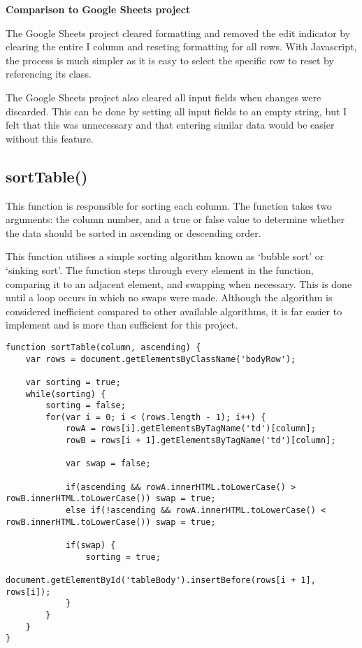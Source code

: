 \documentclass[letterpaper]{article}
\begin{document}
\textbf{Comparison to Google Sheets project}

The Google Sheets project cleared formatting and removed the edit indicator by clearing the entire I column and reseting formatting for all rows.
With Javascript, the process is much simpler as it is easy to select the specific row to reset by referencing its class.

The Google Sheets project also cleared all input fields when changes were discarded.
This can be done by setting all input fields to an empty string, but I felt that this was unnecessary and that entering similar data would be easier without this feature.

\subsection{sortTable()}

This function is responsible for sorting each column.
The function takes two arguments: the column number, and a true or false value to determine whether the data should be sorted in ascending or descending order.

This function utilises a simple sorting algorithm known as `bubble sort' or `sinking sort'.
The function steps through every element in the function, comparing it to an adjacent element, and swapping when necessary.
This is done until a loop occurs in which no swaps were made.
Although the algorithm is considered inefficient compared to other available algorithms, it is far easier to implement and is more than sufficient for this project.

\begin{lstlisting}[firstnumber=222]
function sortTable(column, ascending) {
    var rows = document.getElementsByClassName('bodyRow');

    var sorting = true;
    while(sorting) {
        sorting = false;
        for(var i = 0; i < (rows.length - 1); i++) {
            rowA = rows[i].getElementsByTagName('td')[column];
            rowB = rows[i + 1].getElementsByTagName('td')[column];

            var swap = false;

            if(ascending && rowA.innerHTML.toLowerCase() > rowB.innerHTML.toLowerCase()) swap = true;
            else if(!ascending && rowA.innerHTML.toLowerCase() < rowB.innerHTML.toLowerCase()) swap = true;

            if(swap) {
                sorting = true;
                document.getElementById('tableBody').insertBefore(rows[i + 1], rows[i]);
            }
        }
    }
}
\end{lstlisting}
\end{document}
